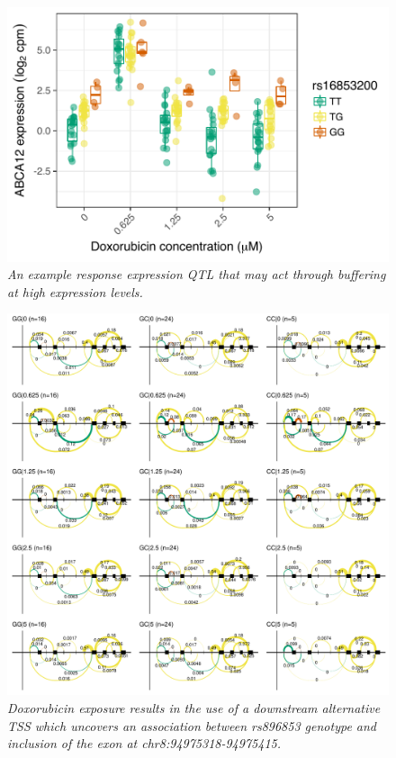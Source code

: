 \documentclass{article}
\begin{document}
\begin{figure}[h]
\begin{center}
    \includegraphics[width=.6\textwidth]{../figures/ABCA12.pdf} %
    \caption{\it{An example response expression QTL that may act through buffering at high expression levels.}}
    \label{fig:ABCA12}
    \end{center}
\end{figure}

\begin{figure}[h]
\begin{center}
    \includegraphics[width=1\textwidth]{../figures/NDUFAF6.pdf} %
    \caption{\it{Doxorubicin exposure results in the use of a downstream alternative TSS which uncovers an association between rs896853 genotype and inclusion of the exon at chr8:94975318-94975415.}}
    \label{fig:NDUFAF6}
    \end{center}
\end{figure}
\end{document}
